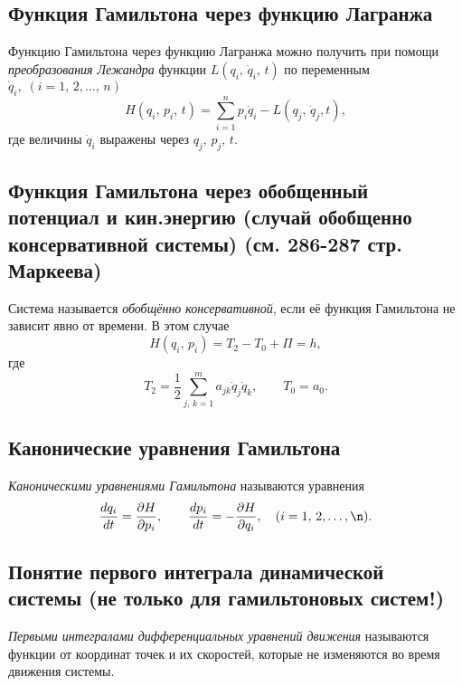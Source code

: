\documentclass[a4paper]{article}
\begin{document}
\subsection{Функция Гамильтона через функцию Лагранжа}
Функцию Гамильтона через функцию Лагранжа можно получить при помощи 
\emph{преобразования Лежандра} функции $L(q_i,\,\dot{q}_i,\,t)$ по переменным
$\dot{q}_i,\;(i=1,\,2,\ldots,\,n)$
\[
	H(q_i,\,p_i,\,t)= \sum_{i=1}^{n} p_i \dot{q}_i -L(q_j,\,\dot{q}_j,t)
,\]
где величины $\dot{q}_i$ выражены через $q_j,\,p_j,\,t$.
\subsection{Функция Гамильтона через обобщенный потенциал и кин.энергию (случай
обобщенно консервативной системы) (см. 286-287 стр. Маркеева)}
Система называется \emph{обобщённо консервативной}, если её функция Гамильтона
не зависит явно от времени. В этом случае
\[
	H(q_i,\,p_i)=T_2-T_0+\Pi=h
,\] 
где
\[
 T_2=\frac{1}{2}\sum_{j,\,k=1}^{m} a_{jk}\dot{q}_j\dot{q}_k,\qquad T_0=a_0
.\] 
\subsection{Канонические уравнения Гамильтона}
\begin{dfn}
	\emph{Каноническими уравнениями Гамильтона} называются уравнения
	\[
	\frac{dq_i}{dt}=\frac{\partial H}{\partial p_i},\qquad
	\frac{dp_i}{dt}=- \frac{\partial H}{\partial q_i}, \quad
	(i=1,\,2,\ldots,\n)
	.\] 
\end{dfn}
\subsection{Понятие первого интеграла динамической системы (не только для
гамильтоновых систем!)}
\begin{dfn}
	\emph{Первыми интегралами дифференциальных уравнений движения}
	называются функции от координат точек и их скоростей, которые не
	изменяются во время движения системы.
\end{dfn}
\end{document}
